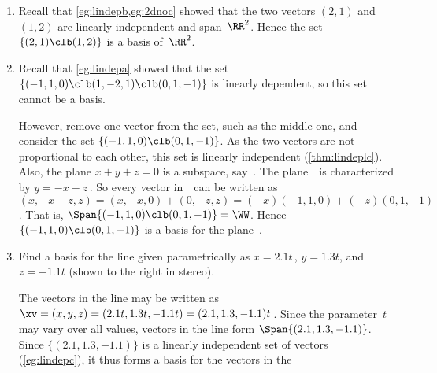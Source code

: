 \begin{example} 
\begin{enumerate}
\item Recall that \cref{eg:lindepb,eg:2dnoc} showed that the two vectors \((2,1)\) and \((1,2)\) are linearly independent and span~\(\RR^2\). 
Hence the set \(\{(2,1)\clb (1,2)\}\) is a basis of~\(\RR^2\).

\item Recall that \cref{eg:lindepa} showed that the set \(\{(-1,1,0)\clb (1,-2,1)\clb (0,1,-1)\}\) is linearly dependent, so this set cannot be a basis.

However, remove one vector from the set, such as the middle one, and consider the set \(\{(-1,1,0)\clb (0,1,-1)\}\).
As the two vectors are not proportional to each other, this set is linearly independent (\cref{thm:lindeplc}).
Also, the plane \(x+y+z=0\) is a subspace, say~\WW.
The plane~\WW\ is characterized by \(y=-x-z\)\,.
So every vector in~\WW\ can be written as \((x,-x-z,z)=(x,-x,0)+(0,-z,z)=(-x)(-1,1,0)+(-z)(0,1,-1)\). 
That is, \(\Span\{(-1,1,0)\clb (0,1,-1)\}=\WW\).
Hence \(\{(-1,1,0)\clb (0,1,-1)\}\) is a basis for the plane~\WW.

\item 
\begin{figbox}{ {}}%
Find a basis for the line given parametrically as \(x=2.1t\)\,, \(y=1.3t\), and \(z=-1.1t\) (shown to the right in stereo).

\begin{solution} 
The vectors in the line may be written as \(\xv=(x,y,z) =(2.1t,1.3t,-1.1t) =(2.1,1.3,-1.1)t\)\,.
Since the parameter~\(t\) may vary over all values, vectors in the line form \(\Span\{(2.1,1.3,-1.1)\}\). 
Since \(\{(2.1,1.3,-1.1)\}\) is a linearly independent set of vectors (\cref{eg:lindepc}), it thus forms a basis for the vectors in the 

\end{solution}
\end{figbox}




\end{enumerate}
\end{example}
